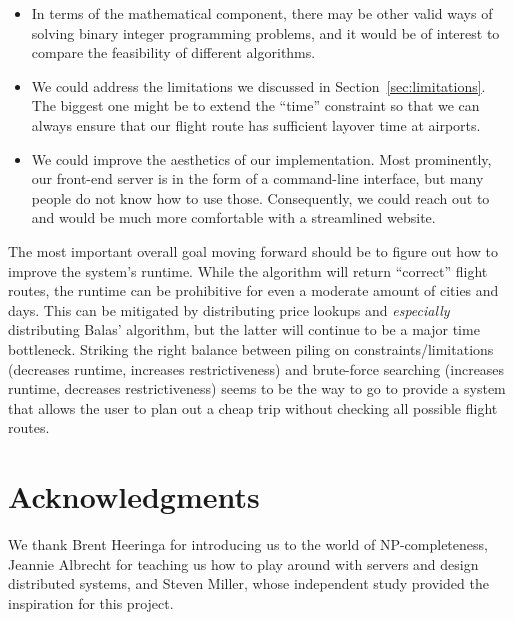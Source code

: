 \documentclass{article}
\begin{document}
\begin{itemize}[noitemsep]
    \item In terms of the mathematical component, there may be other valid ways of solving binary integer programming problems, and it would be of
    interest to compare the feasibility of different algorithms.
    \item We could address the limitations we discussed in Section~\ref{sec:limitations}. The biggest one might be to extend the ``time'' constraint
    so that we can always ensure that our flight route has sufficient layover time at airports.
    \item We could improve the aesthetics of our implementation. Most prominently, our front-end server is in the form of a command-line interface,
    but many people do not know how to use those. Consequently, we could reach out to and would be much more comfortable with a streamlined website.
\end{itemize}

The most important overall goal moving forward should be to figure out how to improve the system's runtime.  While the algorithm will return
``correct'' flight routes, the runtime can be prohibitive for even a moderate amount of cities and days.  This can be mitigated by distributing price
lookups and \emph{especially} distributing Balas' algorithm, but the latter will continue to be a major time bottleneck. Striking the right balance
between piling on constraints/limitations (decreases runtime, increases restrictiveness) and brute-force searching (increases runtime, decreases
restrictiveness) seems to be the way to go to provide a system that allows the user to plan out a cheap trip without checking all possible flight
routes.

\section*{Acknowledgments}
 
We thank Brent Heeringa for introducing us to the world of NP-completeness, Jeannie Albrecht for teaching us how to play around with servers and
design distributed systems, and Steven Miller, whose independent study provided the inspiration for this project.











\onecolumn
\end{document}
